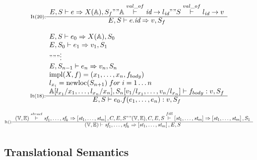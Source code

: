 {\[
\inference[It(20):]{
E,S|-e=>X(\mathbb{A}),S_f "" \mathbb{A} \overset{val\_of}{|-} \textit{id} -> l_{\textit{id}} "" S \overset{val\_of}{|-} l_{\textit{id}} -> v
}
{E,S|-e.\textit{id}=>v,S_f}
\]

\[
\inference[It(18):]{
E,S|-e_0=>X(\mathbb{A}),S_0 \\
E,S_0|-e_1=>v_1,S_1 \\
""" \vdots \\
E,S_{n-1}|-e_n=>v_n,S_n \\
\operatorname{impl}(X,f) = (x_1, \dots, x_n, f_{body}) \\
l_{x_i} = \operatorname{newloc}(S_{n+1}) \; for \; i = 1 \dots n \\
\mathbb{A}[l_{x_1}/x_1, \dots, l_{x_n}/x_n],S_n[v_1/l_{x_1}, \dots, v_n/l_{x_n}]|-f_{body}:v,S_f
}
{E,S|-e_0.f(e_1, \dots, e_n):v,S_f}
\]

%

\[
\inference[It():]{
\mathbb{(V,E)} \overset{struct}{|-} \textit{sf}_1, \dots, \textit{sf}_k => \left[ \textit{st}_1, \dots, \textit{st}_m \right],C,E,S "" \mathbb{(V,E)},C,E,S\overset{fill}{|-} \left[ \textit{st}_1, \dots, \textit{st}_m \right] => \left[ \textit{st}_1, \dots, \textit{st}_m \right], S_1
}{
\mathbb{(V,E)}|- \textit{sf}_1, \dots, \textit{sf}_k => \left[ \textit{st}_1, \dots, \textit{st}_m \right], E, S
}
\]

}



\mathligsoff

\subsection{Translational Semantics}\label{sec:translational-semantic}

